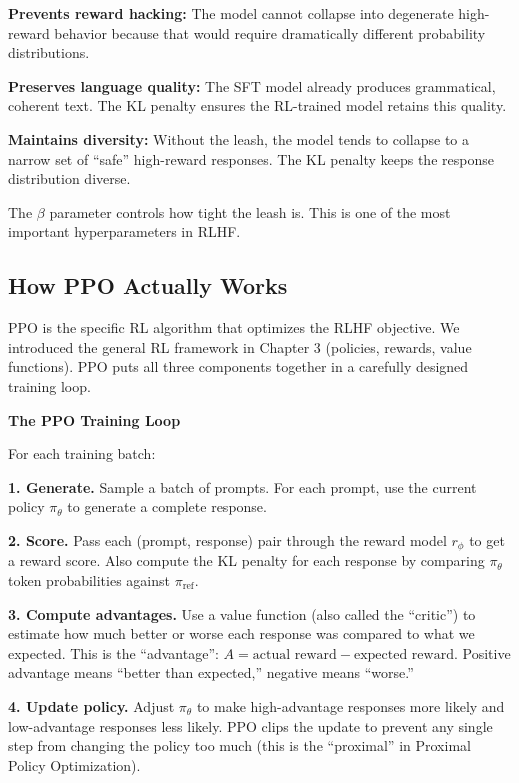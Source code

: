 \begin{chapterenv}
\begin{infobox}
\textbf{Prevents reward hacking:} The model cannot collapse into degenerate high-reward behavior because that would require dramatically different probability distributions.

\textbf{Preserves language quality:} The SFT model already produces grammatical, coherent text. The KL penalty ensures the RL-trained model retains this quality.

\textbf{Maintains diversity:} Without the leash, the model tends to collapse to a narrow set of ``safe'' high-reward responses. The KL penalty keeps the response distribution diverse.

The $\beta$ parameter controls how tight the leash is. This is one of the most important hyperparameters in RLHF.
\end{infobox}

\subsection{How PPO Actually Works}

PPO is the specific RL algorithm that optimizes the RLHF objective. We introduced the general RL framework in Chapter 3 (policies, rewards, value functions). PPO puts all three components together in a carefully designed training loop.

\begin{infobox}
\textbf{The PPO Training Loop}

For each training batch:

\textbf{1. Generate.} Sample a batch of prompts. For each prompt, use the current policy $\pi_\theta$ to generate a complete response.

\textbf{2. Score.} Pass each (prompt, response) pair through the reward model $r_\phi$ to get a reward score. Also compute the KL penalty for each response by comparing $\pi_\theta$ token probabilities against $\pi_{\text{ref}}$.

\textbf{3. Compute advantages.} Use a value function (also called the ``critic'') to estimate how much better or worse each response was compared to what we expected. This is the ``advantage'': $A = \text{actual reward} - \text{expected reward}$. Positive advantage means ``better than expected,'' negative means ``worse.''

\textbf{4. Update policy.} Adjust $\pi_\theta$ to make high-advantage responses more likely and low-advantage responses less likely. PPO clips the update to prevent any single step from changing the policy too much (this is the ``proximal'' in Proximal Policy Optimization).


\end{infobox}
\end{chapterenv}
